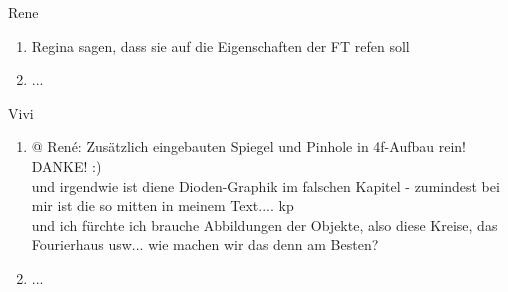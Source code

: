 Rene
\begin{enumerate}
	\item Regina sagen, dass sie auf die Eigenschaften der FT refen soll
	\item ...
\end{enumerate}

Vivi
\begin{enumerate}
	\item @ René: Zusätzlich eingebauten Spiegel und Pinhole in 4f-Aufbau rein! DANKE!  :) \\
	und irgendwie ist diene Dioden-Graphik im falschen Kapitel - zumindest bei mir ist die so mitten in meinem Text.... kp  \\
	und ich fürchte ich brauche Abbildungen der Objekte, also diese Kreise, das Fourierhaus usw... wie machen wir das denn am Besten?   
	\item ...
\end{enumerate}